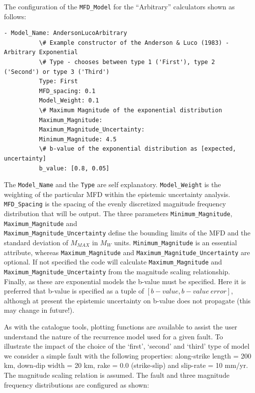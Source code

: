 The configuration of the \verb=MFD_Model= for the \textcite{AndersonLuco1983} ``Arbitrary'' calculators shown as follows:

\begin{Verbatim}[frame=single, commandchars=\\\{\}, fontsize=\scriptsize]
        - Model_Name: AndersonLucoArbitrary
          \# Example constructor of the Anderson & Luco (1983) - Arbitrary Exponential
          \# Type - chooses between type 1 ('First'), type 2 ('Second') or type 3 ('Third')
          Type: First
          MFD_spacing: 0.1
          Model_Weight: 0.1
          \# Maximum Magnitude of the exponential distribution
          Maximum_Magnitude:
          Maximum_Magnitude_Uncertainty:
          Minimum_Magnitude: 4.5
          \# b-value of the exponential distribution as [expected, uncertainty]
          b_value: [0.8, 0.05]
\end{Verbatim}

The \verb=Model_Name= and the \verb=Type= are self explanatory. \verb=Model_Weight= is the weighting of the particular MFD within the epistemic uncertainty analysis. \verb=MFD_Spacing= is the spacing of the evenly discretized magnitude frequency distribution that will be output. The three parameters \verb=Minimum_Magnitude=, \verb=Maximum_Magnitude= and \\ \verb=Maximum_Magnitude_Uncertainty= define the bounding limits of the MFD and the standard deviation of $M_{MAX}$ in $M_W$ units. \verb=Minimum_Magnitude= is an essential attribute, whereas \verb=Maximum_Magnitude= and \verb=Maximum_Magnitude_Uncertainty= are optional. If not specified the code will calculate \verb=Maximum_Magnitude= and \\ \verb=Maximum_Magnitude_Uncertainty= from the magnitude scaling relationship. Finally, as these are exponential models the b-value must be specified. Here it is preferred that b-value is specified as a tuple of $\left[ {b-value, b-value\ error} \right]$, although at present the epistemic uncertainty on b-value does not propagate (this may change in future!). 

As with the catalogue tools, plotting functions are available to assist the user understand the nature of the recurrence model used for a given fault. To illustrate the impact of the choice of the `first', `second' and `third' type of model we consider a simple fault with the following properties: along-strike length = 200 km, down-dip width = 20 km, rake = 0.0 (strike-slip) and slip-rate = 10 mm/yr. The \textcite{wells1994} magnitude scaling relation is assumed. The fault and three magnitude frequency distributions are configured as shown:

